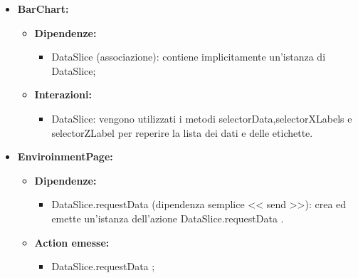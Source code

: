 \begin{itemize}
    \item \textbf{BarChart:}
    \begin{itemize}
        \item \textbf{Dipendenze:}
        \begin{itemize}
            \item DataSlice (associazione): contiene implicitamente un'istanza di DataSlice;
        \end{itemize} 
        \item \textbf{Interazioni:}
        \begin{itemize}
            \item DataSlice: vengono utilizzati i metodi selectorData,selectorXLabels e selectorZLabel per reperire la lista dei dati e delle etichette.
        \end{itemize} 
    \end{itemize}

    \item \textbf{EnviroinmentPage:}
    \begin{itemize}
        \item \textbf{Dipendenze:}
        \begin{itemize}
            \item DataSlice.requestData (dipendenza semplice << send >>): crea ed emette un’istanza dell’azione DataSlice.requestData .
        \end{itemize} 
        \item \textbf{Action emesse:}
        \begin{itemize}
            \item DataSlice.requestData ;
        \end{itemize} 
    \end{itemize}
\end{itemize}

\pagebreak

